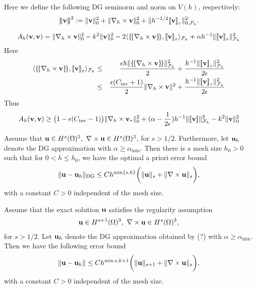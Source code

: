 \documentclass[final,leqno]{siamltex704}
\newcommand{\bv}{{\bf v}}
\def\bu{{\bf u}}
\def\bv{{\bf v}}
\def\ljump{{[\![}}
\def\rjump{{]\!]}}
\def\lavg{{\{\!\{}}
\def\ravg{{\}\!\}}}
\def\3bar{{|\hspace{-.02in}|\hspace{-.02in}|}}
\begin{document}
Here we define the following DG seminorm and norm on $V(h)$, respectively:
\begin{eqnarray}
\3bar\bv\3bar^2:=\|\bv\|_0^2+\|\nabla_h\times\bv\|_0^2+\|h^{-1/2}\ljump\bv\rjump_{\tau}\|_{0,\mathcal{F}_h}^2.
\end{eqnarray}

\begin{eqnarray*}
A_h(\bv,\bv)=\|\nabla_h\times\bv\|_0^2-k^2\|\bv\|_0^2-2\langle\lavg\nabla_h\times\bv\ravg,\ljump\bv\rjump_{\tau}\rangle_{\mathcal{F}_h}+\alpha h^{-1}\|\ljump\bv\rjump_{\tau}\|_{\mathcal{F}_h}^2
\end{eqnarray*}
Here
\begin{eqnarray*}
\langle\lavg\nabla_h\times\bv\ravg,\ljump\bv\rjump_{\tau}\rangle_{\mathcal{F}_h}&\le& 
\frac{\epsilon h\|\lavg\nabla_h\times\bv\ravg\|_{\mathcal{F}_h}^2}{2}
+\frac{h^{-1}\|\ljump\bv\rjump_{\tau}\|_{\mathcal{F}_h}^2}{2\epsilon}\\
&\le& \frac{\epsilon(C_{\text{inv}}+1)}{2}\|\nabla_h\times\bv\|^2+\frac{h^{-1}\|\ljump\bv\rjump_{\tau}\|_{\mathcal{F}_h}^2}{2\epsilon}
\end{eqnarray*}
Thus
\begin{eqnarray*}
A_h(\bv,\bv)\ge \big(1-\epsilon(C_{\text{inv}}-1)\big)\|\nabla_h\times\bv_{\tau}\|_0^2+(\alpha-\frac{1}{2\epsilon})h^{-1}\|\ljump\bv\rjump\|_{\mathcal{F}_h}^2-k^2\|\bv\|_0^2
\end{eqnarray*}
\begin{theorem}
Assume that $\bu\in H^s(\Omega)^3,\ \nabla\times\bu\in H^s(\Omega)^3$, for $s>1/2$. Furthermore, let $\bu_h$ denote the DG approximation with $\alpha\ge \alpha_{\min}.$ Then there is a mesh size $h_0>0$ such that for $0<h\le h_0$, we have the optimal a priori error bound
\begin{eqnarray}
\|\bu-\bu_h\|_{\text{DG}}\le Ch^{\min\{s,k\}}\bigg(\|\bu\|_s+\|\nabla\times\bu\|_s\bigg),
\end{eqnarray}
with a constant $C>0$ independent of the mesh size.
\end{theorem}

\begin{theorem}
Assume that the exact solution $\bu$ satisfies the regularity assumption
\begin{eqnarray}
\bu\in H^{s+1}(\Omega)^3,\ \nabla\times\bu\in H^s(\Omega)^3,
\end{eqnarray}
for $s>1/2$. Let $\bu_h$ denote the DG approximation obtained by (?) with $\alpha\ge\alpha_{\min}$. Then we have the following error bound
\begin{eqnarray}
\|\bu-\bu_h\|\le Ch^{\min{s,k}+1}\bigg(\|\bu\|_{s+1}+\|\nabla\times\bu\|_s\bigg),
\end{eqnarray}
with a constant $C>0$ independent of the mesh size.
\end{theorem}
\end{document}
